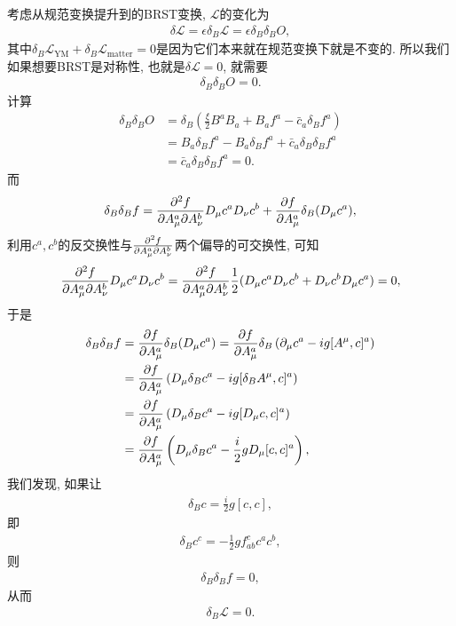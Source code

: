 考虑从规范变换提升到的BRST变换, $\mathcal L$的变化为
\begin{align}
    \delta\mathcal L=\epsilon\delta_B\mathcal L=\epsilon\delta_B\delta_BO,
\end{align}
其中$\delta_B\mathcal L_{\mathrm{YM}}+\delta_B\mathcal L_{\mathrm{matter}}=0$是因为它们本来就在规范变换下就是不变的. 所以我们如果想要BRST是对称性, 也就是$\delta\mathcal L=0$, 就需要
\begin{align}
    \delta_B\delta_BO=0.
\end{align}
计算
\begin{align}
    \delta_B\delta_BO&=\delta_B(\frac\xi2 B^aB_a+B_af^a-\bar c_a\delta_B f^a)\\
    &=B_a\delta_B f^a-B_a\delta_B f^a+\bar c_a\delta_B\delta_B f^a\\
    &=\bar c_a\delta_B\delta_B f^a=0.
\end{align}
而
\begin{align}
    \delta_B\delta_B f=\frac{\partial^2 f}{\partial A_\mu^a\partial A_\nu^b}D_\mu c^aD_\nu c^b+\frac{\partial f}{\partial A_\mu^a}\delta_B(D_\mu c^a),
\end{align}
利用$c^a, c^b$的反交换性与$\frac{\partial^2 f}{\partial A_\mu^a\partial A_\nu^b}$两个偏导的可交换性, 可知
\begin{align}
    \frac{\partial^2 f}{\partial A_\mu^a\partial A_\nu^b}D_\mu c^aD_\nu c^b=\frac{\partial^2 f}{\partial A_\mu^a\partial A_\nu^b}\frac12(D_\mu c^aD_\nu c^b+D_\nu c^bD_\mu c^a)=0,
\end{align}
于是
\begin{align}
    \delta_B\delta_B f&=\frac{\partial f}{\partial A_\mu^a}\delta_B(D_\mu c^a)=\frac{\partial f}{\partial A_\mu^a}\delta_B\left(\partial_\mu c^a-ig[A^\mu, c]^a\right)\\
    &=\frac{\partial f}{\partial A_\mu^a}\left(D_\mu\delta_B c^a-ig[\delta_B A^\mu, c]^a\right)\\
    &=\frac{\partial f}{\partial A_\mu^a}\left(D_\mu\delta_B c^a-ig[D_\mu c, c]^a\right)\\
    &=\frac{\partial f}{\partial A_\mu^a}\left(D_\mu\delta_B c^a-\frac i2gD_\mu[c, c]^a\right),
\end{align}
我们发现, 如果让
\begin{align}
    \delta_B c=\frac i2g[c, c], 
\end{align}
即
\begin{align}
    \delta_B c^c=-\frac12g f^{c}_{ab}c^ac^b, 
\end{align}
则
\begin{align}
    \delta_B\delta_B f=0, 
\end{align}
从而
\begin{align}
    \delta_B\mathcal L=0.
\end{align}
